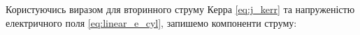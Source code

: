 %
%

Користуючись виразом для вторинного струму Керра \eqref{eq:j_kerr} та 
напруженістю електричного поля \eqref{eq:linear_e_cyl}, запишемо компоненти 
струму:

